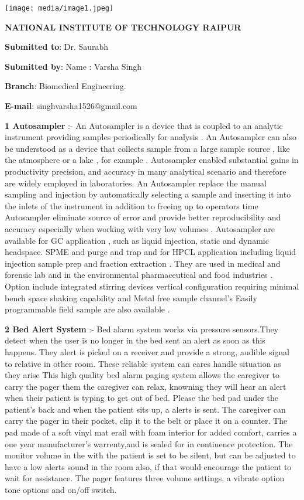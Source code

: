 \documentclass[
]{article}
\author{}
\date{}
\begin{document}
\texttt{[image: media/image1.jpeg]}

\textbf{NATIONAL INSTITUTE OF TECHNOLOGY RAIPUR}

\textbf{Submitted to}: Dr. Saurabh

\textbf{Submitted by}: Name : Varsha Singh

\textbf{Branch}: Biomedical Engineering.

\textbf{E-mail}: singhvarsha1526@gmail.com

\textbf{1 Autosampler} :- An Autosampler is a device that is coupled to
an analytic instrument providing samples periodically for analysis . An
Autosampler can also be understood as a device that collects sample from
a large sample source , like the atmosphere or a lake , for example .
Autosampler enabled substantial gains in productivity precision, and
accuracy in many analytical scenario and therefore are widely employed
in laboratories. An Autosampler replace the manual sampling and
injection by automatically selecting a sample and inserting it into the
inlets of the instrument in addition to freeing up to operators time
Autosampler eliminate source of error and provide better reproducibility
and accuracy especially when working with very low volumes . Autosampler
are available for GC application , such as liquid injection, static and
dynamic headspace. SPME and purge and trap and for HPCL application
including liquid injection sample prep and fraction extraction . They
are used in medical and forensic lab and in the environmental
pharmaceutical and food industries . Option include integrated stirring
devices vertical configuration requiring minimal bench space shaking
capability and Metal free sample channel's Easily programmable field
sample are also available .

\textbf{2 Bed Alert System} :- Bed alarm system works via pressure
sensors.They detect when the user is no longer in the bed sent an alert
as soon as this happens. They alert is picked on a receiver and provide
a strong, audible signal to relative in other room. These reliable
system can cares handle situation as they arise This high quality bed
alarm paging system allows the caregiver to carry the pager them the
caregiver can relax, knowning they will hear an alert when their patient
is typing to get out of bed. Please the bed pad under the patient's back
and when the patient sits up, a alerts is sent. The caregiver can carry
the pager in their pocket, clip it to the belt or place it on a counter.
The pad made of a soft vinyl mat erail with foam interior for added
comfort, carries a one year manufacturer's warrenty,and is sealed for in
continence protection. The monitor volume in the with the patient is set
to be silent, but can be adjusted to have a low alerts sound in the room
also, if that would encourage the patient to wait for assistance. The
pager features three volume settings, a vibrate option tone options and
on/off switch.
\end{document}
